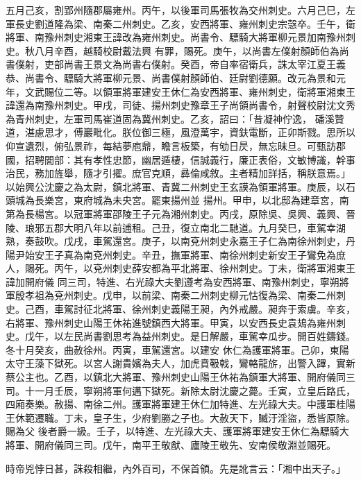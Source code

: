 \begin{pinyinscope}
 五月己亥，割郢州隨郡屬雍州。丙午，以後軍司馬張牧為交州刺史。六月己巳，左軍長史劉道隆為梁、南秦二州刺史。乙亥，安西將軍、雍州刺史宗愨卒。壬午，衛將軍、南豫州刺史湘東王諱改為雍州刺史。尚書令、驃騎大將軍柳元景加南豫州刺史。秋八月辛酉，越騎校尉戴法興
 有罪，賜死。庚午，以尚書左僕射顏師伯為尚書僕射，吏部尚書王景文為尚書右僕射。癸酉，帝自率宿衛兵，誅太宰江夏王義恭、尚書令、驃騎大將軍柳元景、尚書僕射顏師伯、廷尉劉德願。改元為景和元年，文武賜位二等。以領軍將軍建安王休仁為安西將軍、雍州刺史，衛將軍湘東王諱還為南豫州刺史。甲戌，司徒、揚州刺史豫章王子尚領尚書令，射聲校尉沈文秀為青州刺史，左軍司馬崔道固為冀州刺史。乙亥，詔曰：「昔凝神佇逸，
 磻溪贊道，湛慮思才，傅巖毗化。朕位御三極，風澄萬宇，資鈇電斷，正卯斯戮。思所以仰宣遺烈，俯弘景祚，每結夢庖鼎，瞻言板築，有劬日昃，無忘昧旦。可甄訪郡國，招聘閭部：其有孝性忠節，幽居遁棲，信誠義行，廉正表俗，文敏博識，幹事治民，務加旌舉，隨才引擢。庶官克順，彞倫咸敘。主者精加詳括，稱朕意焉。」以始興公沈慶之為太尉，鎮北將軍、青冀二州刺史王玄謨為領軍將軍。庚辰，以石頭城為長樂宮，東府城為未央宮。罷東揚州並
 揚州。甲申，以北邸為建章宮，南第為長楊宮。以冠軍將軍邵陵王子元為湘州刺史。丙戌，原除吳、吳興、義興、晉陵、琅邪五郡大明八年以前逋租。己丑，復立南北二馳道。九月癸巳，車駕幸湖熟，奏鼓吹。戊戌，車駕還宮。庚子，以南兗州刺史永嘉王子仁為南徐州刺史，丹陽尹始安王子真為南兗州刺史。辛丑，撫軍將軍、南徐州刺史新安王子鸞免為庶人，賜死。丙午，以兗州刺史薛安都為平北將軍、徐州刺史。丁未，衛將軍湘東王諱加開府儀
 同三司，特進、右光祿大夫劉遵考為安西將軍、南豫州刺史，寧朔將軍殷孝祖為兗州刺史。戊申，以前梁、南秦二州刺史柳元怙復為梁、南秦二州刺史。己酉，車駕討征北將軍、徐州刺史義陽王昶，內外戒嚴。昶奔于索虜。辛亥，右將軍、豫州刺史山陽王休祐進號鎮西大將軍。甲寅，以安西長史袁鳷為雍州刺史。戊午，以左民尚書劉思考為益州刺史。是日解嚴，車駕幸瓜步。開百姓鑄錢。冬十月癸亥，曲赦徐州。丙寅，車駕還宮。以建安
 休仁為護軍將軍。己卯，東陽太守王藻下獄死。以宮人謝貴嬪為夫人，加虎賁靸戟，鸞輅龍旂，出警入蹕，實新蔡公主也。乙酉，以鎮北大將軍、豫州刺史山陽王休祐為鎮軍大將軍、開府儀同三司。十一月壬辰，寧朔將軍何邁下獄死。新除太尉沈慶之薨。壬寅，立皇后路氏，四廂奏樂。赦揚、南徐二州。護軍將軍建王休仁加特進、左光祿大夫。中護軍桂陽王休範遷職。丁未，皇子生，少府劉勝之子也。大赦天下，贓汙淫盜，悉皆原除。賜為父
 後者爵一級。壬子，以特進、左光祿大夫、護軍將軍建安王休仁為驃騎大將軍、開府儀同三司。戊午，南平王敬猷、廬陵王敬先、安南侯敬淵並賜死。



 時帝兇悖日甚，誅殺相繼，內外百司，不保首領。先是訛言云：「湘中出天子。」




\end{pinyinscope}
